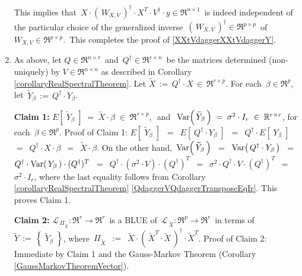 \begin{enumerate}
	This implies that
	\,$X \cdot \left(\,W_{X,V}\,\right)^{\dagger} \cdot X^{T} \cdot V^{\dagger} \cdot y \in \Re^{n \times 1}$\,
	is indeed independent of the particular choice of the generalized inverse
	\,$\left(\,W_{X,V}\,\right)^{\dagger} \in \Re^{p \times p}$\,
	of \,$W_{X,V} \in \Re^{p \times p}$.\,
	This completes the proof of \eqref{XXtVdaggerXXtVdaggerY}.
\item
	As above, let $Q \in \Re^{n \times r}$\, and \,$Q^{\dagger} \in \Re^{r \times n}$\,
	be the matrices determined (non-uniquely) by $V \in \Re^{n \times n}$
	as described in Corollary \ref{corollaryRealSpectralTheorem}.
	Let $\widetilde{X} \,:=\, Q^{\dagger} \cdot X \,\in\, \Re^{r \times p}$.
	For each \,$\beta \in \Re^{p}$,\, let \,$\widetilde{Y}_{\beta} \,:=\, Q^{\dagger} \cdot Y_{\beta}$.
	
	\vskip 0.5cm
	\noindent
	\textbf{Claim 1:}\quad
	$E\!\left[\;\widetilde{Y}_{\beta}\;\right] \; = \; \widetilde{X} \cdot \beta \; \in \; \Re^{r \times p}$,\,
	\,and\,
	\,$\textnormal{Var}\!\left(\,\widetilde{Y}_{\beta}\,\right) \; = \; \sigma^{2} \cdot I_{r} \; \in \; \mathbb{R}^{r \times r}$,\;
	for each \,$\beta \in \Re^{p}$.
	\vskip 0.0cm
	\noindent
	Proof of Claim 1:\quad
	$E\!\left[\;\widetilde{Y}_{\beta}\;\right]$
	\,$=$\, $E\!\left[\;Q^{\dagger} \cdot Y_{\beta}\;\right]$
	\,$=$\, $Q^{\dagger} \cdot E\!\left[\;Y_{\beta}\;\right]$
	\,$=$\, $Q^{\dagger} \cdot X \cdot \beta$
	\,$=$\, $\widetilde{X} \cdot \beta$.
	On the other hand,
	\,$\textnormal{Var}\!\left(\,\widetilde{Y}_{\beta}\,\right)$
	\,$=$\, $\textnormal{Var}\!\left(\,Q^{\dagger} \cdot Y_{\beta}\,\right)$
	\,$=$\, $Q^{\dagger} \cdot \textnormal{Var}\!\left(\,Y_{\beta}\,\right) \cdot (Q^{\dagger})^{T}$
	\,$=$\, $Q^{\dagger} \cdot (\sigma^{2} \cdot V) \cdot (Q^{\dagger})^{T}$
	\,$=$\, $\sigma^{2} \cdot Q^{\dagger} \cdot V \cdot (Q^{\dagger})^{T}$
	\,$=$\, $\sigma^{2} \cdot I_{r}$,
	where the last equality follows from
	Corollary \ref{corollaryRealSpectralTheorem} \eqref{QdaggerVQdaggerTransposeEqIr}.
	This proves Claim 1.

	\vskip 0.5cm
	\noindent
	\textbf{Claim 2:}\quad
	$\mathcal{L}_{\,\Pi_{\widetilde{X}}} : \Re^{r} \longrightarrow \Re^{r}$\,
	is a BLUE of 
	\,$\mathcal{L}_{\,\widetilde{X}} : \Re^{p} \longrightarrow \Re^{r}$\,
	in terms of
	\,$\widetilde{Y} \,:=\, \left\{\;\widetilde{Y}_{\beta}\;\right\}$,
	where
	\,$\Pi_{\widetilde{X}}$
	\,$:=$\, $\widetilde{X} \cdot (\,\widetilde{X}^{T} \cdot \widetilde{X}\,)^{\dagger} \cdot \widetilde{X}^{T}$.
	\vskip 0.0cm
	\noindent
	Proof of Claim 2:\quad
	Immediate by Claim 1 and the Gauss-Markov Theorem (Corollary \ref{GaussMarkovTheoremVector}).


\end{enumerate}
